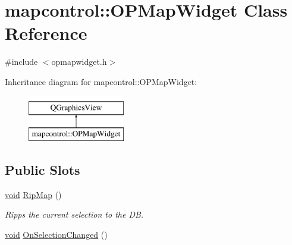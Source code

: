 \hypertarget{classmapcontrol_1_1_o_p_map_widget}{\section{mapcontrol\-:\-:O\-P\-Map\-Widget Class Reference}
\label{classmapcontrol_1_1_o_p_map_widget}
}


{\ttfamily \#include $<$opmapwidget.\-h$>$}

Inheritance diagram for mapcontrol\-:\-:O\-P\-Map\-Widget\-:\begin{figure}[H]
\begin{center}
\leavevmode
\includegraphics[height=2.000000cm]{classmapcontrol_1_1_o_p_map_widget}
\end{center}
\end{figure}
\subsection*{Public Slots}
\begin{DoxyCompactItemize}
\item 
\hyperlink{group___u_a_v_objects_plugin_ga444cf2ff3f0ecbe028adce838d373f5c}{void} \hyperlink{group___o_p_map_widget_ga3cc1af46a4555caac4d2bcafc775dd3c}{Rip\-Map} ()
\begin{DoxyCompactList}\small\item\em Ripps the current selection to the D\-B. \end{DoxyCompactList}\item 
\hyperlink{group___u_a_v_objects_plugin_ga444cf2ff3f0ecbe028adce838d373f5c}{void} \hyperlink{group___o_p_map_widget_gaebc469fcc05092fd93d332b528eae3e5}{On\-Selection\-Changed} ()
\end{DoxyCompactItemize}
